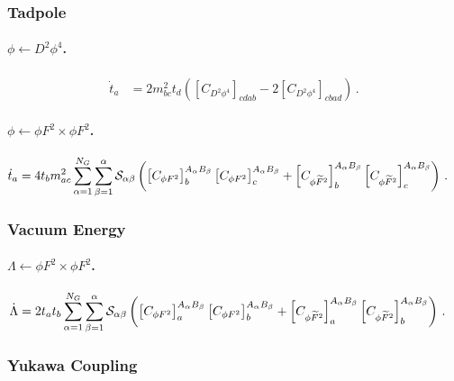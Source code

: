 \subsubsection{Tadpole}

\paragraph{\texorpdfstring{$\phi \leftarrow D^2\phi^4$}{phifromD2phi4}.}

\begin{align}
    \dot{t}_{a} &= 
    2 m^2_{bc} t_d \left(
    \left[C_{D^2\phi^4}\right]_{cdab}-2\left[C_{D^2\phi^4}\right]_{cbad}
    \right)\,.
\end{align}

\paragraph{\texorpdfstring{$\phi \leftarrow \phi F^2 \times \phi F^2$}{phifromphiF2xphiF2}.}

\begin{align}
    \dot{t}_{a} &= 4 t_{b } m^2_{ac} \sum_{\alpha=1}^{N_G}\sum_{\beta=1}^\alpha \mathcal{S}_{\alpha\beta}\left( \left[C_{\phi F^2}\right]_{b}^{A_\alpha B_\beta} \left[C_{\phi F^2}\right]_{c}^{A_\alpha B_\beta} + \left[C_{\phi \widetilde{F}^2}\right]_{b}^{A_\alpha B_\beta} \left[C_{\phi \widetilde{F}^2}\right]_{c}^{A_\alpha B_\beta}\right)\,.
\end{align}

\subsubsection{Vacuum Energy}

\paragraph{\texorpdfstring{$\Lambda \leftarrow \phi F^2 \times \phi F^2$}{LambdafromphiF2xphiF2}.}

\begin{align}
    \dot{\Lambda} &= 2 t_{a} t_b \sum_{\alpha=1}^{N_G}\sum_{\beta=1}^\alpha \mathcal{S}_{\alpha\beta} \left( \left[C_{\phi F^2}\right]_{a}^{A_\alpha B_\beta} \left[C_{\phi F^2}\right]_{b}^{A_\alpha B_\beta} + \left[C_{\phi \widetilde{F}^2}\right]_{a}^{A_\alpha B_\beta} \left[C_{\phi \widetilde{F}^2}\right]_{b}^{A_\alpha B_\beta}\right)\,.
\end{align}

\subsubsection{Yukawa Coupling}

